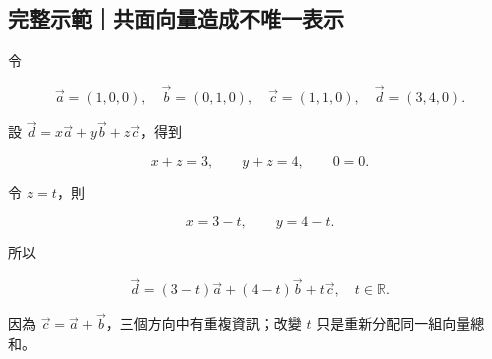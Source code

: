 \documentclass[11pt,a4paper]{article}
\begin{document}
\begin{HandoutWorkedExample}

\subsection{完整示範｜共面向量造成不唯一表示}\label{ux5b8cux6574ux793aux7bc4ux5171ux9762ux5411ux91cfux9020ux6210ux4e0dux552fux4e00ux8868ux793a}

令

\[
\vec a=(1,0,0),\quad
\vec b=(0,1,0),\quad
\vec c=(1,1,0),\quad
\vec d=(3,4,0).
\]

設 \(\vec d=x\vec a+y\vec b+z\vec c\)，得到

\[
x+z=3,\qquad y+z=4,\qquad 0=0.
\]

令 \(z=t\)，則

\[
x=3-t,\qquad y=4-t.
\]

所以

\[
\boxed{\vec d=(3-t)\vec a+(4-t)\vec b+t\vec c,\quad t\in\mathbb R}.
\]

因為 \(\vec c=\vec a+\vec b\)，三個方向中有重複資訊；改變 \(t\) 只是重新分配同一組向量總和。

\end{HandoutWorkedExample}
\end{document}
